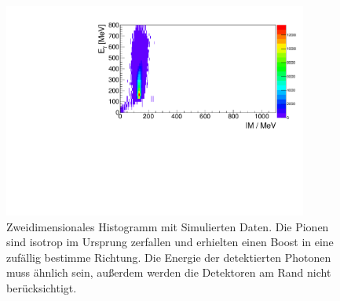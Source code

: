 \documentclass[a4paper,11pt,oneside,final,german,openbib,pdftex]{scrbook}
\begin{document}
{\begin{appendix}

\begin{figure}[h!]
	\begin{center}
		\includegraphics[width=100mm]{NewCalib/UrsprungIsotrop/20171904SimUrsprungIsotrop30DegreeCutHist}
		\caption[Simulation: 2D-Hist Isotroper Boost im Ursprung ohne Detektoren am Rand]{Zweidimensionales Histogramm mit Simulierten Daten. Die Pionen sind isotrop im Ursprung zerfallen und erhielten einen Boost in eine zuf\"allig bestimme Richtung. Die Energie der detektierten Photonen muss \"ahnlich sein, au{\ss}erdem werden die Detektoren am Rand nicht ber\"ucksichtigt.}
		\label{fig:Sim-Data-Ursprung-2DHist-30-Degree-Edge}
	\end{center}
\end{figure}



\end{appendix}}
\end{document}
